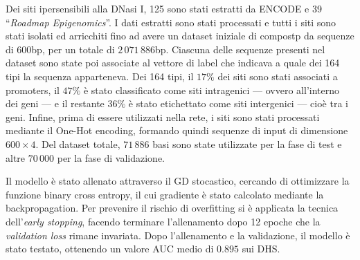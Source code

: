 Dei siti ipersensibili alla DNasi I, 125 sono stati estratti da \acs{ENCODE} e 39 ``\textit{Roadmap Epigenomics}''. I dati estratti sono stati processati e tutti i siti sono stati isolati ed arricchiti fino ad avere un dataset iniziale di compostp da sequenze di 600bp, per un totale di $2\,071\,886$bp. Ciascuna delle sequenze presenti nel dataset sono state poi associate al vettore di label che indicava a quale dei 164 tipi la sequenza apparteneva. Dei 164 tipi, il $17\%$ dei siti sono stati associati a promoters, il $47\%$ è stato classificato come siti intragenici — ovvero all'interno dei geni — e il restante $36\%$ è stato etichettato come siti intergenici — cioè tra i geni. Infine, prima di essere utilizzati nella rete, i siti sono stati processati mediante il One-Hot encoding, formando quindi sequenze di input di dimensione $600\times 4$. Del dataset totale, $71\,886$ basi sono state utilizzate per la fase di test e altre $70\,000$ per la fase di validazione.

Il modello è stato allenato attraverso il \acs{GD} stocastico, cercando di ottimizzare la funzione binary cross entropy, il cui gradiente è stato calcolato mediante la backpropagation. Per prevenire il rischio di overfitting si è applicata la tecnica dell'\textit{early stopping}, facendo terminare l'allenamento dopo 12 epoche che la \textit{validation loss} rimane invariata. Dopo l'allenamento e la validazione, il modello è stato testato, ottenendo un valore AUC medio di $0.895$ sui \acs{DHS}.

